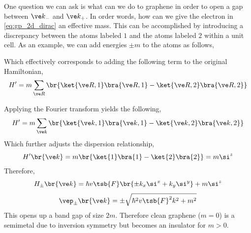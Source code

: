 \documentclass{article}
\begin{document}
One question we can ask is what can we do to graphene in order to open a gap between $\ve k_{-}$ and $\ve k_{+}$. In order words, how can we give the electron in \cref{eq:gp_2d_dirac} an effective mass. This can be accomplished by introducing a discrepancy between the atoms labeled $1$ and the atoms labeled $2$ within a unit cell. As an example, we can add energies $\pm m$ to the atoms as follows,

\begin{center}
\end{center}

Which effectively corresponds to adding the following term to the original Hamiltonian,
\[ H' = m \sum_{\ve R} \br{\ket{\ve R, 1}\bra{\ve R, 1} - \ket{\ve R, 2}\bra{\ve R, 2}} \]


Applying the Fourier transform yields the following,
\[ H' = m \sum_{\ve k} \br{\ket{\ve k, 1}\bra{\ve k, 1} - \ket{\ve k, 2}\bra{\ve k, 2}} \]
Which further adjusts the dispersion relationship,
\[ H'\br{\ve k} = m \br{\ket{1}\bra{1} - \ket{2}\bra{2}} = m \si^{z} \]
Therefore,
\[ H_{\pm}\br{\ve k} =\hbar v\tsb{F} \br{\pm k_x \si^x + k_y \si^{y}} + m\si^{z} \]
\[ \vep_{\pm} \br{\ve k} = \pm \sqrt{\hbar^2 v\tsb{F}^2 k^2 + m^2} \]
This opens up a band gap of size $2m$. Therefore clean graphene ($m=0$) is a semimetal due to inversion symmetry but becomes an insulator for $m > 0$. \\
\end{document}
